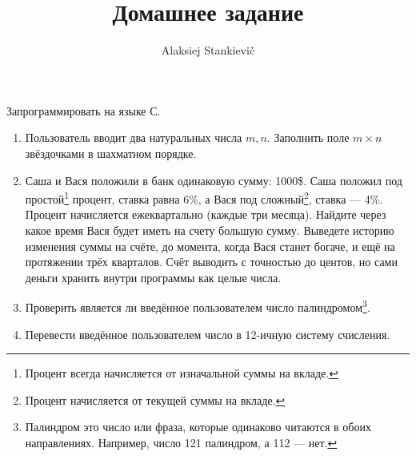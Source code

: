 \documentclass[12pt]{article}
\author{Alaksiej Stankievič}
\title{Домашнее задание}
\begin{document}


 Запрограммировать на языке С.
 \begin{enumerate}
  \item Пользователь вводит два натуральных числа $m, n$. Заполнить поле $m\times{}n$ звёздочками в шахматном порядке.
  \item Саша и Вася положили в банк одинаковую сумму: 1000\$. Саша положил под простой\footnote{Процент всегда начисляется от изначальной суммы на вкладе.} процент, ставка равна 6\%, а Вася под сложный\footnote{Процент начисляется от текущей суммы на вкладе.}, ставка --- 4\%. Процент начисляется ежеквартально (каждые три месяца). Найдите через какое время Вася будет иметь на счету большую сумму. Выведете  историю изменения суммы на счёте, до момента, когда Вася станет богаче, и ещё на протяжении трёх кварталов. Счёт выводить с точностью до центов, но сами деньги хранить внутри программы как целые числа.
  \item Проверить является ли введённое пользователем число палиндромом\footnote{Палиндром это число или фраза, которые одинаково читаются в обоих направлениях. Например, число 121 палиндром, а 112 --- нет.}.
  \item Перевести введённое пользователем число в 12-ичную систему счисления.
 \end{enumerate}
\end{document}
